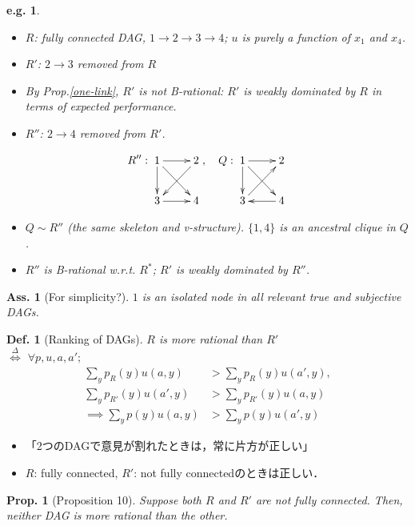 \documentclass[11pt,a4paper,dvipdfmx]{article}
\theoremstyle{plain}
\newtheorem{prop}{Prop.}[section]
\newtheorem{df}{Def.}[section]
\newtheorem{eg}{e.g.}[section]
\newtheorem{ass}{Ass.}[section]
\newcommand{\defi}{\stackrel{\Delta}{\Longleftrightarrow}}
\begin{document}
\begin{eg}
	\begin{itemize}
		\item $R$: fully connected DAG, $1 \to 2 \to 3 \to 4$; $u$ is purely a function of $x_1$ and $x_4$.
		\item $R'$: $2 \to 3$ removed from $R$
		\item By Prop.\ref{one-link}, $R'$ is not B-rational: $R'$ is weakly dominated by $R$ in terms of expected performance.
		\item $R''$: $2 \to 4$ removed from $R'$.
	\end{itemize}
	\[
	R'': \xymatrix{
		1 \ar[r] \ar[d] \ar[rd] & 2 \ar[ld]  \\
		3 \ar[r] & 4
	}, \quad
	Q: \xymatrix{
		1 \ar[r] \ar[d] \ar[rd] & 2   \\
		3 \ar[ru] & 4 \ar[l]
	}
	\]
	\begin{itemize}
		\item $Q \sim R''$ (the same skeleton and v-structure). $\{1,4\}$ is an ancestral clique in $Q$.
		\item $R''$ is B-rational w.r.t. $R^*$; $R'$ is weakly dominated by $R''$.
	\end{itemize}
\end{eg}

\begin{ass}[For simplicity?]
	$1$ is an isolated node in all relevant true and subjective DAGs.
\end{ass}

\begin{df}[Ranking of DAGs]
	$R$ is more rational than $R'$ \\
	$\defi$ $\forall p, u, a, a';$
	\begin{align}
		\sum_y p_R(y) u(a, y) &> \sum_y p_R(y) u(a', y), \label{cond1} \\
		\sum_y p_{R'}(y) u(a', y) &> \sum_y p_{R'}(y) u(a, y) \label{cond2} \\
		\implies \sum_y p(y) u(a, y) &> \sum_y p(y) u(a', y)
	\end{align}
\end{df}
\begin{itemize}
	\item 「2つのDAGで意見が割れたときは，常に片方が正しい」
	\item $R$: fully connected, $R'$: not fully connectedのときは正しい．
\end{itemize}

\begin{screen}
\begin{prop}[Proposition 10]
	Suppose both $R$ and $R'$ are not fully connected. Then, neither DAG is more rational than the other.
\end{prop}
\end{screen}
\end{document}
